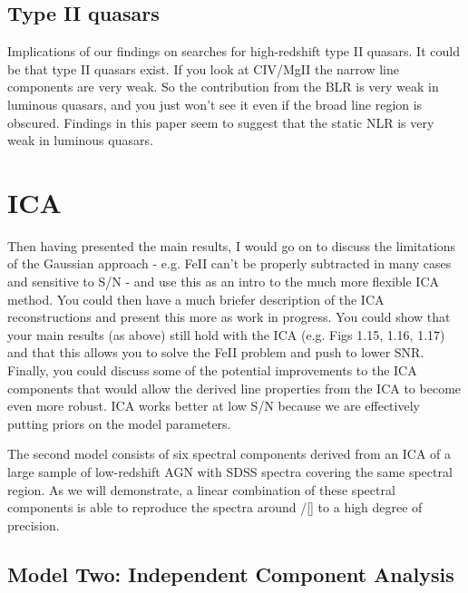 \subsection{Type II quasars}

Implications of our findings on searches for high-redshift type II quasars. 
It could be that type II quasars exist. 
If you look at CIV/MgII the narrow line components are very weak. 
So the contribution from the \ac{BLR} is very weak in luminous quasars, and you just won't see it even if the broad line region is obscured.
Findings in this paper seem to suggest that the static \ac{NLR} is very weak in luminous quasars. 


\section{ICA}

Then having presented the main results, I would go on to discuss the limitations of the Gaussian approach - e.g. FeII can't be properly subtracted in many cases and sensitive to S/N - and use this as an intro to the much more flexible ICA method. You could then have a much briefer description of the ICA reconstructions and present this more as work in progress. You could show that your main results (as above) still hold with the ICA (e.g. Figs 1.15, 1.16, 1.17) and that this allows you to solve the FeII problem and push to lower SNR. Finally, you could discuss some of the potential improvements to the ICA components that would allow the derived line properties from the ICA to become even more robust. ICA works better at low S/N because we are effectively putting priors on the model parameters. 


The second model consists of six spectral components derived from an \ac{ICA} of a large sample of low-redshift \ac{AGN} with \ac{SDSS} spectra covering the same spectral region.
As we will demonstrate, a linear combination of these spectral components is able to reproduce the spectra around \hbns/[] to a high degree of precision.  

\subsection{Model Two: Independent Component Analysis}

